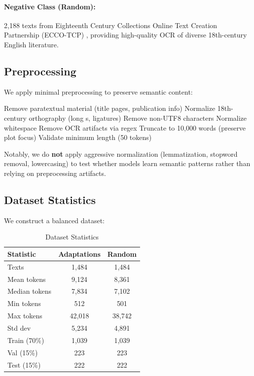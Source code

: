 \documentclass[11pt,a4paper]{article}
\begin{document}
\paragraph{Negative Class (Random):} 2,188 texts from Eighteenth Century Collections Online Text Creation Partnership (ECCO-TCP) \cite{Welzenbach2011ECCO}, providing high-quality OCR of diverse 18th-century English literature.

\subsection{Preprocessing}

We apply minimal preprocessing to preserve semantic content:

\begin{algorithm}
\caption{Text Preprocessing}
\begin{algorithmic}[1]
\STATE Remove paratextual material (title pages, publication info)
\STATE Normalize 18th-century orthography (long s, ligatures) \cite{Underwood2015DataMunging}
\STATE Remove non-UTF8 characters
\STATE Normalize whitespace
\STATE Remove OCR artifacts via regex
\STATE Truncate to 10,000 words (preserve plot focus)
\STATE Validate minimum length (50 tokens)
\end{algorithmic}
\end{algorithm}

Notably, we do \textbf{not} apply aggressive normalization (lemmatization, stopword removal, lowercasing) to test whether models learn semantic patterns rather than relying on preprocessing artifacts.

\subsection{Dataset Statistics}

We construct a balanced dataset:

\begin{table}[h]
\centering
\small
\caption{Dataset Statistics}
\begin{tabular}{lcc}
\toprule
\textbf{Statistic} & \textbf{Adaptations} & \textbf{Random} \\
\midrule
Texts & 1,484 & 1,484 \\
Mean tokens & 9,124 & 8,361 \\
Median tokens & 7,834 & 7,102 \\
Min tokens & 512 & 501 \\
Max tokens & 42,018 & 38,742 \\
Std dev & 5,234 & 4,891 \\
\midrule
Train (70\%) & 1,039 & 1,039 \\
Val (15\%) & 223 & 223 \\
Test (15\%) & 222 & 222 \\
\bottomrule
\end{tabular}
\end{table}
\end{document}

